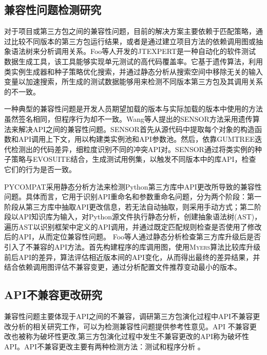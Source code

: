 \subsection{兼容性问题检测研究}
对于项目或第三方包之间的兼容性问题，目前的解决方案主要依赖于匹配策略，通过比较不同版本的第三方包运行结果，或者是通过建立项目方法的依赖调用图或抽象语法树来分析调用关系。Foo等人开发的JTEXPERT是一种自动化的软件测试数据生成工具，该工具能够实现单元测试的高代码覆盖率。它基于遗传算法，利用类实例生成器和种子策略优化搜索，并通过静态分析从搜索空间中移除无关的输入变量以加速搜索，所生成的测试数据能够用来检测不同版本第三方包及其调用关系的不一致。

一种典型的兼容性问题是开发人员期望加载的版本与实际加载的版本中使用的方法虽然签名相同，但程序行为却不一致。Wang等人提出的\textsc{SENSOR}方法采用遗传算法来解决API之间的兼容性问题。\textsc{SENSOR}首先从源代码中提取每个对象的构造函数和API调用上下文，用以构建类实例池和API参数池。然后，依靠\textsc{GUMTREE}迭代检测出的代码差异，细粒度识别不同的冲突API对。\textsc{SENSOR}通过将类实例的种子策略与\textsc{EVOSUITE}结合，生成测试用例集，以触发不同版本中的库API，检查它们的行为是否一致。

\textsc{PYCOMPAT}采用静态分析方法来检测Python第三方库中API更改所导致的兼容性问题。具体而言，它用于识别API重命名和参数重命名问题，分为两个阶段：第一阶段从第三方库中抽取API更改信息，若无法自动抽取，则采用手动方式；第二阶段以API知识库为输入，对Python源文件执行静态分析，创建抽象语法树(AST)，遍历AST以识别框架中定义的API调用，并通过既定匹配规则检查是否使用了修改后的API，从而定位兼容性问题。 Foo等人通过静态分析检查第三方库升级后是否引入了不兼容的API方法。首先构建程序的库调用图，使用\textsc{Myers}算法比较库升级前后API的差异，算法评估相近版本间的API变化，从而得出最终的差异结果，并结合依赖调用图评估不兼容变更，通过分析配置文件推荐变动最小的版本。
\subsection{API不兼容更改研究}
兼容性问题主要体现于API之间的不兼容，调研第三方包演化过程中API不兼容更改分析的相关研究工作，可以为检测兼容性问题提供参考性意见。API 不兼容更改也被称为破坏性更改,第三方包演化过程中发生不兼容更改的API称为破坏性API。API不兼容更改主要有两种检测方法：测试和程序分析 。

